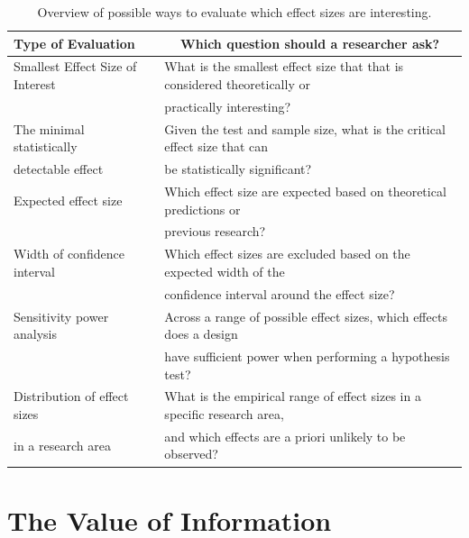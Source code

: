\documentclass[
  english,
  ,jou, a4paper,floatsintext]{apa6}
\begin{document}
\begin{table}[tbp]

\begin{center}
\begin{threeparttable}

\caption{\label{tab:table-effect-eval}Overview of possible ways to evaluate which effect sizes are interesting.}

\begin{tabular}{ll}
\toprule
Type of Evaluation & \multicolumn{1}{c}{Which question should a researcher ask?}\\
\midrule
Smallest Effect Size of Interest & What is the smallest effect size that that is considered theoretically or\\
 & practically interesting?\\ \midrule
The minimal statistically & Given the test and sample size, what is the critical effect size that can\\
detectable effect & be statistically significant?\\ \midrule
Expected effect size & Which effect size are expected based on theoretical predictions or\\
 & previous research?\\ \midrule
Width of confidence interval & Which effect sizes are excluded based on the expected width of the\\
 & confidence interval around the effect size?\\ \midrule
Sensitivity power analysis & Across a range of possible effect sizes, which effects does a design\\
 & have sufficient power when performing a hypothesis test?\\ \midrule
Distribution of effect sizes & What is the empirical range of effect sizes in a specific research area,\\
in a research area & and which effects are a priori unlikely to be observed?\\
\bottomrule
\end{tabular}

\end{threeparttable}
\end{center}

\end{table}

\hypertarget{the-value-of-information}{%
\section{The Value of Information}\label{the-value-of-information}}
\end{document}
